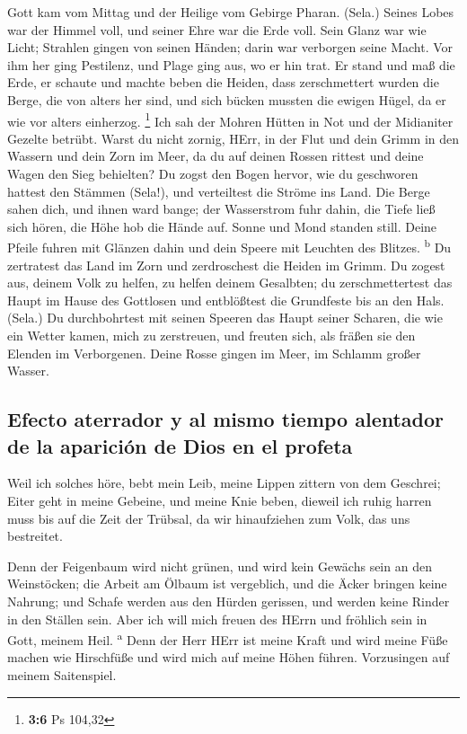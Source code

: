  Gott kam vom Mittag und der Heilige vom Gebirge Pharan.
(Sela.) Seines Lobes war der Himmel voll, und seiner Ehre war die Erde
voll.  Sein Glanz war wie Licht; Strahlen gingen von
seinen Händen; darin war verborgen seine Macht.  Vor ihm
her ging Pestilenz, und Plage ging aus, wo er hin trat. 
Er stand und maß die Erde, er schaute und machte beben die Heiden, dass
zerschmettert wurden die Berge, die von alters her sind, und sich bücken
mussten die ewigen Hügel, da er wie vor alters einherzog. \footnote{\textbf{3:6}
  Ps 104,32}  Ich sah der Mohren Hütten in Not und der
Midianiter Gezelte betrübt.  Warst du nicht zornig, HErr,
in der Flut und dein Grimm in den Wassern und dein Zorn im Meer, da du
auf deinen Rossen rittest und deine Wagen den Sieg behielten?
 Du zogst den Bogen hervor, wie du geschworen hattest den
Stämmen (Sela!), und verteiltest die Ströme ins Land. 
Die Berge sahen dich, und ihnen ward bange; der Wasserstrom fuhr dahin,
die Tiefe ließ sich hören, die Höhe hob die Hände auf. 
Sonne und Mond standen still. Deine Pfeile fuhren mit Glänzen dahin und
dein Speere mit Leuchten des Blitzes. \textsuperscript{b}
 Du zertratest das Land im Zorn und zerdroschest die
Heiden im Grimm.  Du zogest aus, deinem Volk zu helfen,
zu helfen deinem Gesalbten; du zerschmettertest das Haupt im Hause des
Gottlosen und entblößtest die Grundfeste bis an den Hals. (Sela.)
 Du durchbohrtest mit seinen Speeren das Haupt seiner
Scharen, die wie ein Wetter kamen, mich zu zerstreuen, und freuten sich,
als fräßen sie den Elenden im Verborgenen.  Deine Rosse
gingen im Meer, im Schlamm großer Wasser.

\hypertarget{efecto-aterrador-y-al-mismo-tiempo-alentador-de-la-apariciuxf3n-de-dios-en-el-profeta}{%
\subsection{Efecto aterrador y al mismo tiempo alentador de la aparición
de Dios en el
profeta}\label{efecto-aterrador-y-al-mismo-tiempo-alentador-de-la-apariciuxf3n-de-dios-en-el-profeta}}

 Weil ich solches höre, bebt mein Leib, meine Lippen
zittern von dem Geschrei; Eiter geht in meine Gebeine, und meine Knie
beben, dieweil ich ruhig harren muss bis auf die Zeit der Trübsal, da
wir hinaufziehen zum Volk, das uns bestreitet.

 Denn der Feigenbaum wird nicht grünen, und wird kein
Gewächs sein an den Weinstöcken; die Arbeit am Ölbaum ist vergeblich,
und die Äcker bringen keine Nahrung; und Schafe werden aus den Hürden
gerissen, und werden keine Rinder in den Ställen sein. 
Aber ich will mich freuen des HErrn und fröhlich sein in Gott, meinem
Heil. \textsuperscript{a}  Denn der Herr HErr ist meine
Kraft und wird meine Füße machen wie Hirschfüße und wird mich auf meine
Höhen führen. Vorzusingen auf meinem Saitenspiel.
